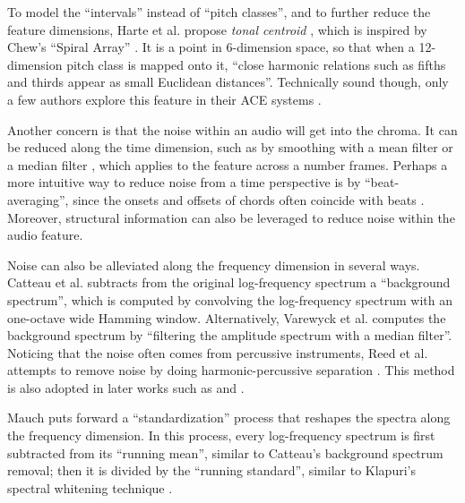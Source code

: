 To model the ``intervals'' instead of ``pitch classes'', and to further reduce the feature dimensions, Harte et al. propose {\it tonal centroid} \cite{harte2006detecting}, which is inspired by Chew's ``Spiral Array'' \cite{chew2000towards}. It is a point in 6-dimension space, so that when a 12-dimension pitch class is mapped onto it, ``close harmonic relations such as fifths and thirds appear as small Euclidean distances''. Technically sound though, only a few authors explore this feature in their ACE systems \cite{lee2008acoustic,humphrey2012learning}.
 
Another concern is that the noise within an audio will get into the chroma. It can be reduced along the time dimension, such as by smoothing with a mean filter \cite{harte2005automatic,humphrey2012rethinking} or a median filter \cite{khadkevich2009use,mauch2008discrete}, which applies to the feature across a number frames. Perhaps a more intuitive way to reduce noise from a time perspective is by ``beat-averaging''\cite{bello2005robust,mauch2010approximate}, since the onsets and offsets of chords often coincide with beats \cite{goto1999real}. Moreover, structural information can also be leveraged \cite{mauch2009using,cho2011feature,cho2014improved} to reduce noise within the audio feature.

Noise can also be alleviated along the frequency dimension in several ways. Catteau et al. \cite{catteau2007probabilistic} subtracts from the original log-frequency spectrum a ``background spectrum'', which is computed by convolving the log-frequency spectrum with an one-octave wide Hamming window. Alternatively, Varewyck et al. \cite{varewyck2008novel} computes the background spectrum by ``filtering the amplitude spectrum with a median filter''. Noticing that the noise often comes from percussive instruments, Reed et al. \cite{reed2009minimum} attempts to remove noise by doing harmonic-percussive separation \cite{ono2008separation}. This method is also adopted in later works such as \cite{ni2012end} and \cite{ueda2010hmm}.

Mauch \cite{mauch2010automatic} puts forward a ``standardization'' process that reshapes the spectra along the frequency dimension. In this process, every log-frequency spectrum is first subtracted from its ``running mean'', similar to Catteau's background spectrum removal; then it is divided by the ``running standard'', similar to Klapuri's spectral whitening technique \cite{klapuri2006multiple}.

